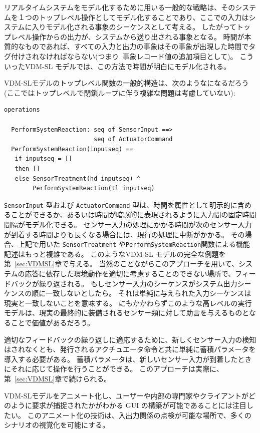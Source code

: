 \documentclass[\pformat,12pt]{jreport}
\begin{document}
リアルタイムシステムをモデル化するために用いる一般的な戦略は、そのシステムを１つのトップレベル操作としてモデル化することであり、ここでの入力はシステムに入りモデル化される事象のシーケンスとして考える。
したがってトップレベル操作からの出力が、システムから送り出される事象となる。
時間が本質的なものであれば、すべての入力と出力の事象はその事象が出現した時間でタグ付けされなければならない(つまり\ 事象レコード値の追加項目として)。
こういったVDM-SL モデルでは、この方法で時間が明白にモデル化される。

VDM-SLモデルのトップレベル関数の一般的構造は、次のようなになるだろう(ここではトップレベルで閉鎖ループに伴う複雑な問題は考慮していない):

\begin{lstlisting}
operations

  PerformSystemReaction: seq of SensorInput ==> 
                         seq of ActuatorCommand
  PerformSystemReaction(inputseq) ==
   if inputseq = []
   then []
   else SensorTreatment(hd inputseq) ^ 
        PerformSystemReaction(tl inputseq)
\end{lstlisting}

 \texttt{SensorInput} 型および \texttt{ActuatorCommand} 型は、時間を属性として明示的に含めることができるか、あるいは時間が暗黙的に表現されるように入力間の固定時間間隔がモデル化できる。
センサー入力の処理にかかる時間が次のセンサー入力が到着する時間よりも長くなる場合には、現行の処理に中断がかかる。
その場合、上記で用いた \texttt{SensorTreatment} や\texttt{PerformSystemReaction}関数による機能記述はもっと複雑である。
このようなVDM-SL モデルの完全な例題を第~\ref{sec:VDMSL}章で与える。
当然のことながらこのアプローチを用いて、システムの応答に依存した環境動作を適切に考慮することのできない場所で、フィードバックが繰り返される。
もしセンサー入力のシーケンスがシステム出力シーケンスの順に一致しないとしたら。
それは単純に与えられた入力シーケンスは現実と一致しないことを意味する。
にもかかわらずこのような高レベルの実行モデルは、現実の最終的に装備されるセンサー類に対して助言を与えるものとなることで価値があるだろう。

適切なフィードバックの繰り返しに適応するために、新しくセンサー入力の検知はされなくとも、発行されるアクチュエータ命令と共に単純に蓄積パラメータを導入する必要がある。
蓄積パラメータは、新しいセンサー入力が到着したときにそれに応じて操作を行うことができる。
このアプローチは実際に、第~\ref{sec:VDMSL}章で続けられる。

 VDM-SLモデルをアニメート化し、ユーザーや内部の専門家やクライアントがどのように要求が捕捉されたかがわかる GUI の構築が可能であることには注目したい。
このアニメート化の技術は、入出力関係の点検が可能な場所で、多くのシナリオの視覚化を可能にする。
\end{document}

